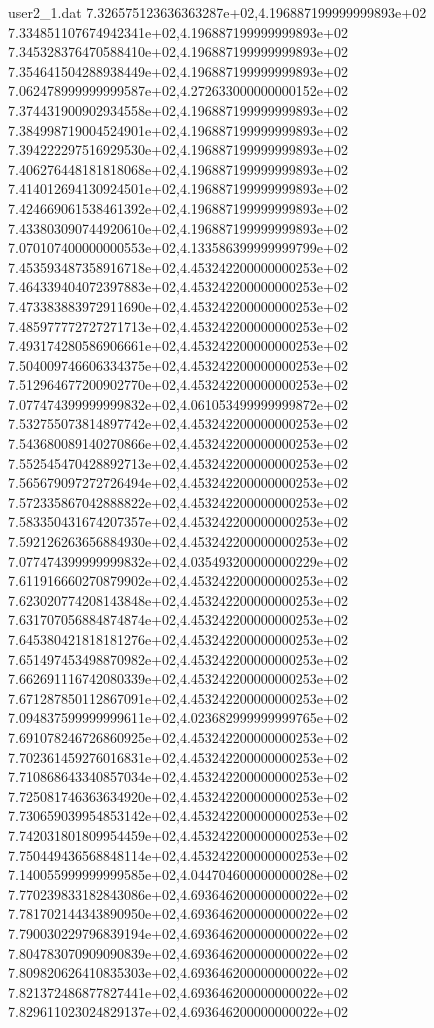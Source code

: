 \begin{filecontents}{user2_1.dat}
7.326575123636363287e+02,4.196887199999999893e+02
7.334851107674942341e+02,4.196887199999999893e+02
7.345328376470588410e+02,4.196887199999999893e+02
7.354641504288938449e+02,4.196887199999999893e+02
7.062478999999999587e+02,4.272633000000000152e+02
7.374431900902934558e+02,4.196887199999999893e+02
7.384998719004524901e+02,4.196887199999999893e+02
7.394222297516929530e+02,4.196887199999999893e+02
7.406276448181818068e+02,4.196887199999999893e+02
7.414012694130924501e+02,4.196887199999999893e+02
7.424669061538461392e+02,4.196887199999999893e+02
7.433803090744920610e+02,4.196887199999999893e+02
7.070107400000000553e+02,4.133586399999999799e+02
7.453593487358916718e+02,4.453242200000000253e+02
7.464339404072397883e+02,4.453242200000000253e+02
7.473383883972911690e+02,4.453242200000000253e+02
7.485977772727271713e+02,4.453242200000000253e+02
7.493174280586906661e+02,4.453242200000000253e+02
7.504009746606334375e+02,4.453242200000000253e+02
7.512964677200902770e+02,4.453242200000000253e+02
7.077474399999999832e+02,4.061053499999999872e+02
7.532755073814897742e+02,4.453242200000000253e+02
7.543680089140270866e+02,4.453242200000000253e+02
7.552545470428892713e+02,4.453242200000000253e+02
7.565679097272726494e+02,4.453242200000000253e+02
7.572335867042888822e+02,4.453242200000000253e+02
7.583350431674207357e+02,4.453242200000000253e+02
7.592126263656884930e+02,4.453242200000000253e+02
7.077474399999999832e+02,4.035493200000000229e+02
7.611916660270879902e+02,4.453242200000000253e+02
7.623020774208143848e+02,4.453242200000000253e+02
7.631707056884874874e+02,4.453242200000000253e+02
7.645380421818181276e+02,4.453242200000000253e+02
7.651497453498870982e+02,4.453242200000000253e+02
7.662691116742080339e+02,4.453242200000000253e+02
7.671287850112867091e+02,4.453242200000000253e+02
7.094837599999999611e+02,4.023682999999999765e+02
7.691078246726860925e+02,4.453242200000000253e+02
7.702361459276016831e+02,4.453242200000000253e+02
7.710868643340857034e+02,4.453242200000000253e+02
7.725081746363634920e+02,4.453242200000000253e+02
7.730659039954853142e+02,4.453242200000000253e+02
7.742031801809954459e+02,4.453242200000000253e+02
7.750449436568848114e+02,4.453242200000000253e+02
7.140055999999999585e+02,4.044704600000000028e+02
7.770239833182843086e+02,4.693646200000000022e+02
7.781702144343890950e+02,4.693646200000000022e+02
7.790030229796839194e+02,4.693646200000000022e+02
7.804783070909090839e+02,4.693646200000000022e+02
7.809820626410835303e+02,4.693646200000000022e+02
7.821372486877827441e+02,4.693646200000000022e+02
7.829611023024829137e+02,4.693646200000000022e+02

\end{filecontents}
